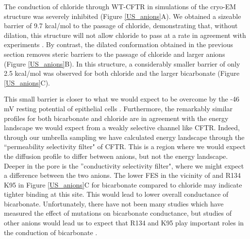 The conduction of chloride through WT-CFTR in simulations of the cryo-EM structure was severely inhibited (Figure \ref{US_anions}A). We obtained a sizeable barrier of 9.7 kcal/mol to the passage of chloride, demonstrating that, without dilation, this structure will not allow chloride to pass at a rate in agreement with experiments \cite{gong2004}. By contrast, the dilated conformation obtained in the previous section removes steric barriers to the passage of chloride and larger anions (Figure \ref{US_anions}B). In this structure, a considerably smaller barrier of only 2.5 kcal/mol was observed for both chloride and the larger bicarbonate (Figure \ref{US_anions}C). 

This small barrier is closer to what we would expect to be overcome by the -46 mV resting potential of epithelial cells \cite{josephson1979}. Furthermore, the remarkably similar profiles for both bicarbonate and chloride are in agreement with the energy landscape we would expect from a weakly selective channel like CFTR. Indeed, through our umbrella sampling we have calculated energy landscape through the ``permeability selectivity filter" of CFTR. This is a region where we would expect the diffusion profile to differ between anions, but not the energy landscape. Deeper in the pore is the ''conductivity selectivity filter", where we might expect a difference between the two anions. The lower FES in the vicinity of and R134 K95 in Figure \ref{US_anions}C for bicarbonate compared to chloride may indicate tighter binding at this site. This would lead to lower overall conductance of bicarbonate. Unfortunately, there have not been many studies which have measured the effect of mutations on bicarbonate conductance, but studies of other anions would lead us to expect that R134 and K95 play important roles in the conduction of bicarbonate \cite{linsdell2016}. 

